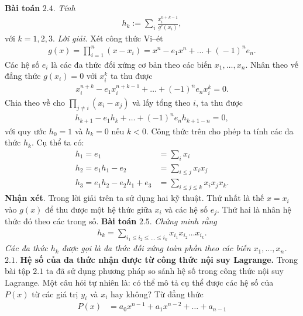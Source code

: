 \begin{multicols}{2}
	\vskip 0.1cm
	\textbf{\color{hoccungpi}Bài toán} $\pmb{2.4.}$
	\textit{Tính} 
	\begin{align*}
		h_{k}:=\sum_i\frac{x_i^{n+k-1}}{g'(x_i)},
	\end{align*}
	với $k=1,2,3.$
	\vskip 0.1cm 
	\textit{Lời giải.} 
	Xét công thức Vi--ét 
	\begin{align*}
		g(x)\!=\!\prod_{i=1}^n(x\!-\!x_i)\!=\!x^{n}\!-\!e_1x^n\!+\!\ldots\!+\!(\!-\!1)^{n}e_{n}.
	\end{align*}
	Các hệ số $e_i$ là các {\color{blue} đa thức đối xứng cơ bản} theo
	các biến $x_1,\ldots,x_n$. 
	\vskip 0.1cm
	Nhân theo vế  đẳng thức $g(x_i)=0$ với $x_i^{k}$ ta thu được
	\begin{align*}
		x_i^{n+k}-e_1x_i^{n+k-1}+\ldots+(-1)^{n}e_{n}
		x_i^{k}=0.
	\end{align*}	
	{\color{blue} Chia theo về cho  $ \prod_{j\neq i}(x_i-x_j)$}
	và lấy tổng theo $i$, ta thu được 
	\begin{align*}
		h_{k+1}-e_1h_{k}+\ldots+(-1)^{n}e_{n}h_{k+1-n}=0,
	\end{align*}
	với quy ước {\color{blue} $h_0=1$ và $h_k=0$ nếu $k<0$.} 
	Công thức trên cho phép ta tính các đa thức $h_k$. 
	Cụ thể ta có: 
	\begin{align*}
		h_1=e_1&=\sum_i x_i\\
		h_2=e_1h_1-e_2&=\sum_{i\leq j}x_ix_j\\
		h_3=e_1h_2-e_2h_1+e_3&=\sum_{i\leq j\leq k}x_ix_jx_k.
	\end{align*}
	\textbf{\color{hoccungpi}Nhận xét}. Trong lời giải trên ta sử dụng hai kỹ thuật. Thứ nhất là thế $x=x_i$ vào $g(x)$ để thu được một hệ thức giữa  $x_i$ và các hệ số $e_j$. Thứ hai là nhân hệ thức đó theo các {\color{blue} trong số}. 
	\vskip 0.1cm
	\textbf{\color{hoccungpi}Bài toán} $\pmb{2.5.}$  \textit{Chứng minh rằng
	\begin{align*}
		h_k=\sum_{i_1\leq i_2\leq\ldots\leq i_k}x_{i_1}x_{i_2}\ldots x_{i_k}.
	\end{align*}
	Các đa thức $h_k$ được gọi là {\color{blue} \em đa thức đối xứng toàn phần} theo các biến $x_1,\ldots,x_n$.}
	\vskip 0.1cm
	$\pmb{2.1.}$ \textbf{\color{hoccungpi}Hệ số của đa thức nhận được từ công thức nội suy Lagrange.}
	Trong bài tập $2.1$ ta đã sử dụng phương pháp so sánh hệ số trong công thức nội suy Lagrange. Một câu hỏi tự nhiên là: {\color{blue} có thể mô tả cụ thể được các hệ số của $P(x)$ từ các giá trị $y_i$ và $x_i$ hay không?}
	\vskip 0.1cm
	Từ đẳng thức
	\begin{align*}
		P(x)&= a_0x^{n-1}+a_1x^{n-2}+\ldots+a_{n-1} \\

\end{align*}
\end{multicols}
